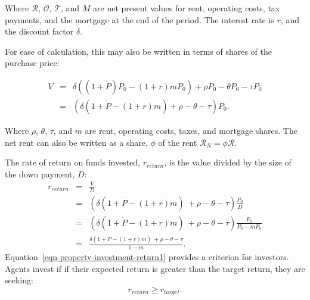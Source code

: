  Where $\mathcal{R}$, $\mathcal{O}$, $\mathcal{T}$, and $M$ are  net present values for rent, operating costs, tax payments, and the mortgage at the end of the period. The interest rate is $r$, and the discount factor $\delta$.

 For ease of calculation, this may also be written in terms of shares of the purchase price:

\begin{eqnarray}
V &=& \delta \left((1+\dot P) P_0 - (1+r)mP_0\right) + \rho P_0 - \theta P_0 - \tau P_0 \nonumber \\
  &=& \left(\delta \left(1+\dot P - (1+r)m   \right) + \rho     - \theta     - \tau\right) P_0.
\label{eqn-property-investment-value2}
\end{eqnarray}
 
 Where $\rho$, $\theta$, $\tau$, and $m$ are rent, operating costs, taxes, and mortgage shares. The net rent can also be written as a share, $\phi$ of the rent $\mathcal{R}_N = \phi \mathcal{R}$. %

The rate of return on funds invested, $r_{return}$, is the value divided by the size of the down payment, $D$: 
\begin{eqnarray}
r_{return} 
  &=& \frac{V}{D}  \nonumber \\
  &=& \left(\delta \left(1+\dot P - (1+r)m\right) \ + \rho - \theta - \tau \right) \frac{P_0}{D}        \nonumber \\
  &=& \left(\delta \left(1+\dot P - (1+r)m\right) \ + \rho - \theta - \tau \right) \frac{P_0}{P_0-mP_0} \nonumber \\ 
  &=& \frac{\delta \left(1+\dot P - (1+r)m\right) \ + \rho - \theta - \tau }{1-m}.
\label{eqn-property-investment-return1}
\end{eqnarray}
Equation~\ref{eqn-property-investment-return1} provides a criterion for investors. Agents invest if if their expected return is greater than the target return, they are seeking:
\begin{equation}
r_{return} \geq r_{target}. 
\label{eqn-property-investment-return2}
\end{equation}

